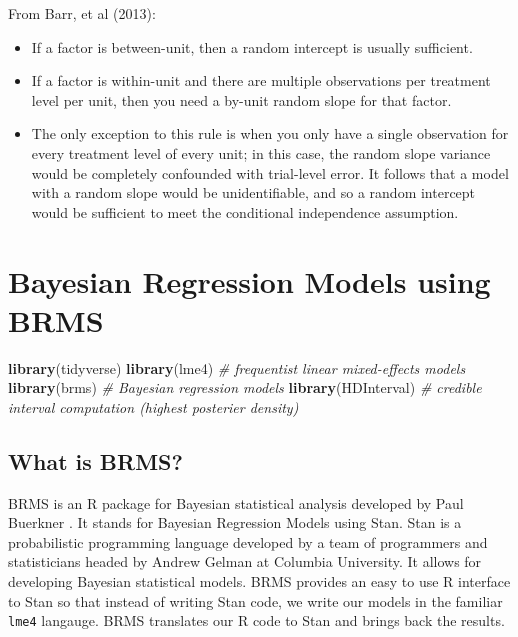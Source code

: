 \documentclass[]{book}
\newenvironment{Shaded}{\begin{snugshade}}{\end{snugshade}}
\newcommand{\CommentTok}[1]{\textcolor[rgb]{0.56,0.35,0.01}{\textit{#1}}}
\newcommand{\KeywordTok}[1]{\textcolor[rgb]{0.13,0.29,0.53}{\textbf{#1}}}
\newcommand{\NormalTok}[1]{#1}
\begin{document}
From Barr, et al (2013):

\begin{itemize}
\item
  If a factor is between-unit, then a random intercept is usually sufficient.
\item
  If a factor is within-unit and there are multiple observations per treatment level per unit, then you need a by-unit random slope for that factor.
\item
  The only exception to this rule is when you only have a single observation for every treatment level of every unit; in this case, the random slope variance would be completely confounded with trial-level error. It follows that a model with a random slope would be unidentifiable, and so a random intercept would be sufficient to meet the conditional independence assumption.
\end{itemize}

\hypertarget{brms}{%
\chapter{Bayesian Regression Models using BRMS}\label{brms}}

\begin{Shaded}
\begin{Highlighting}[]
\KeywordTok{library}\NormalTok{(tidyverse)}
\KeywordTok{library}\NormalTok{(lme4) }\CommentTok{# frequentist linear mixed-effects models}
\KeywordTok{library}\NormalTok{(brms) }\CommentTok{# Bayesian regression models}
\KeywordTok{library}\NormalTok{(HDInterval) }\CommentTok{# credible interval computation (highest posterier density)}
\end{Highlighting}
\end{Shaded}

\hypertarget{what-is-brms}{%
\section{What is BRMS?}\label{what-is-brms}}

BRMS is an R package for Bayesian statistical analysis developed by Paul Buerkner \citep{burkner2017brms}. It stands for Bayesian Regression Models using Stan. Stan is a probabilistic programming language developed by a team of programmers and statisticians headed by Andrew Gelman at Columbia University. It allows for developing Bayesian statistical models. BRMS provides an easy to use R interface to Stan so that instead of writing Stan code, we write our models in the familiar \texttt{lme4} langauge. BRMS translates our R code to Stan and brings back the results.
\end{document}
